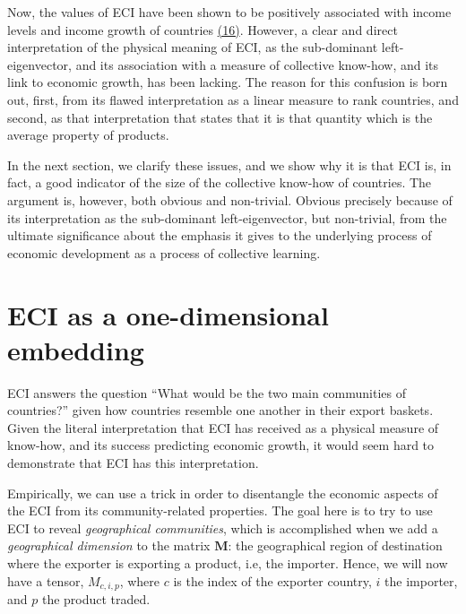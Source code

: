 \documentclass{pnastwo}
\newcommand{\mtx}[1]{\mathbf{ #1}}
\begin{document}
\begin{article}
Now, the values of ECI have been shown to be positively associated with income levels and income growth of countries \hyperref[csl:16]{(16)}. However, a clear and direct interpretation of the physical meaning of ECI, as the sub-dominant left-eigenvector, and its association with a measure of collective know-how, and its link to economic growth, has been lacking. The reason for this confusion is born out, first, from its flawed interpretation as a linear measure to rank countries, and second, as that interpretation that states that it is that quantity which is the average property of products.

In the next section, we clarify these issues, and we show why it is that ECI is, in fact, a good indicator of the size of the collective know-how of countries. The argument is, however, both obvious and non-trivial. Obvious precisely because of its interpretation as the sub-dominant left-eigenvector, but non-trivial, from the ultimate significance about the emphasis it gives to the underlying process of economic development as a process of collective learning.


\section{ECI as a one-dimensional embedding}
ECI answers the question ``What would be the two main communities of countries?'' given how countries resemble one another in their export baskets. Given the literal interpretation that ECI has received as a physical measure of know-how, and its success predicting economic growth, it would seem hard to demonstrate that ECI has this interpretation. 

Empirically, we can use a trick in order to disentangle the economic aspects of the ECI from its community-related properties. The goal here is to try to use ECI to reveal \emph{geographical communities}, which is accomplished when we add a \emph{geographical dimension} to the matrix $\mtx{M}$: the geographical region of destination where the exporter is exporting a product, i.e, the importer. Hence, we will now have a tensor, $M_{c,i,p}$, where $c$ is the index of the exporter country, $i$ the importer, and $p$ the product traded. 



\end{article}
\end{document}
